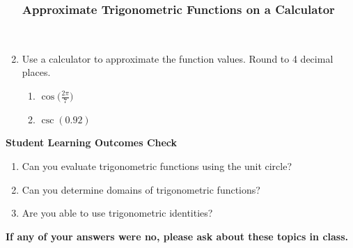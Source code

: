 \begin{enumerate}
\subsubsection{Approximate Trigonometric Functions on a Calculator} ~

\item Use a calculator to approximate the function values.  Round to 4 decimal places.
\begin{enumerate}
\item $\displaystyle \cos \Bigg( \frac{2\pi}{7} \Bigg)$\\
\item $\csc(0.92)$\\[.2in]
\end{enumerate}



\end{enumerate}

\noindent \textbf{Student Learning Outcomes Check}

\begin{enumerate}
\item Can you evaluate trigonometric functions using the unit circle?
\item Can you determine domains of trigonometric functions?
\item Are you able to use trigonometric identities?

\end{enumerate}

\noindent \textbf{If any of your answers were no, please ask about these topics in class.}


